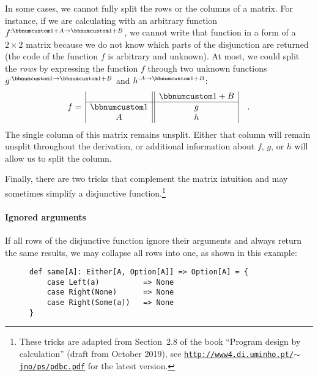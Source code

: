In some cases, we cannot fully split the rows or the columns of a
matrix. For instance, if we are calculating with an arbitrary function
$f^{:\bbnum 1+A\rightarrow\bbnum 1+B}$, we cannot write that function
in a form of a $2\times2$ matrix because we do not know which parts
of the disjunction are returned (the code of the function $f$ is
arbitrary and unknown). At most, we could split the \emph{rows} by
expressing the function $f$ through two unknown functions $g^{:\bbnum 1\rightarrow\bbnum 1+B}$
and $h^{:A\rightarrow\bbnum 1+B}$:
\[
f=\,\begin{array}{|c||c|}
 & \bbnum 1+B\\
\hline \bbnum 1 & g\\
A & h
\end{array}\quad.
\]
The single column of this matrix remains unsplit. Either that column
will remain unsplit throughout the derivation, or additional information
about $f$, $g$, or $h$ will allow us to split the column.

Finally, there are two tricks that complement the matrix intuition
and may sometimes simplify a disjunctive function.\footnote{These tricks are adapted from Section~2.8 of the book \textsf{``}Program
design by calculation\textsf{''} (draft from October 2019), see \texttt{\href{http://www4.di.uminho.pt/~jno/ps/pdbc.pdf}{http://www4.di.uminho.pt/$\sim$jno/ps/pdbc.pdf}}
for the latest version.}

\paragraph{Ignored arguments}

If all rows of the disjunctive function ignore their arguments and
always return the same results, we may collapse all rows into one,
as shown in this example:

\begin{wrapfigure}{L}{0.51\columnwidth}%
\vspace{-0.2\baselineskip}
\begin{lstlisting}
def same[A]: Either[A, Option[A]] => Option[A] = {
    case Left(a)          => None
    case Right(None)      => None
    case Right(Some(a))   => None
}
\end{lstlisting}
\vspace{-3\baselineskip}
\end{wrapfigure}%

